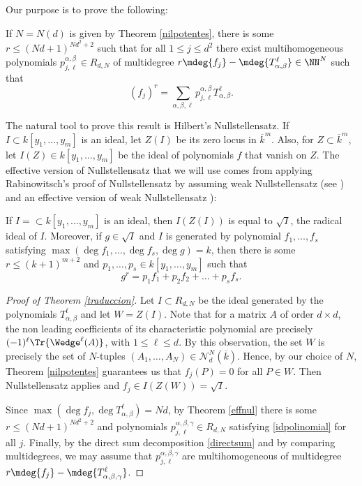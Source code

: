 Our purpose is to prove the following:
\begin{teo}\label{traduccion}
If $N\!=\!N(d)$ is given by Theorem \ref{nilpotentes}, there is some \hbox{$r\!\leq\!(Nd\!+\!1)^{Nd^2+2}$} such that for all $1\leq j\leq d^2$ there exist multihomogeneous polynomials $p^{\alpha,\beta}_{j,\ell} \in R_{d,N}$ of multidegree $r\mdeg{f_{j}}-\mdeg{T^{\ell}_{\alpha,\beta}}\in {\NN}^{N}$ such that
\begin{equation}\label{idpolinomial}
(f_{j})^{r}=\sum_{\alpha,\beta,\ell}{p^{\alpha,\beta}_{j,\ell}T^{\ell}_{\alpha,\beta}}.
\end{equation}
\end{teo}

The natural tool to prove this result is Hilbert's Nullstellensatz. If $I\subset k[y_1,\dots,y_m]$ is an ideal, let $Z(I)$ be its zero locus in ${\overline{k}}^m$. Also, for $Z\subset \overline{k}^m$, let $I(Z)\in k[y_1,\dots,y_m]$ be the ideal of polynomials $f$ that vanish on $Z$. The effective version of Nullstellensatz that we will use comes from applying Rabinowitsch's proof of Nullstellensatz by assuming weak Nullstellensatz (see \eg \cite[\S 1.7]{fulton}) and an effective version of weak Nullstellensatz \cite{som}):

\begin{teo}\label{effnul} If $I=\subset k[y_1,\dots,y_m]$ is an ideal, then $I(Z(I))$ is equal to $\sqrt{I}$, the radical ideal of $I$. Moreover, if $g\in \sqrt{I}$ and $I$ is generated by polynomial $f_1,\dots,f_s$ satisfying $\max(\deg{f_1},\dots,\deg{f_s},\deg{g})=k$, then there is some $r\leq (k+1)^{m+2}$ and $p_1,\dots,p_s\in k[y_1,\dots,y_m]$ such that
\begin{equation*}
g^r=p_1f_1+p_2f_2+\dots+p_sf_s.
\end{equation*}
\end{teo}
\begin{proof}[Proof of Theorem \ref{traduccion}]
Let $I\subset R_{d,N}$ be the ideal generated by the polynomials $T_{\alpha,\beta}^{\ell}$ and let $W=Z(I)$.
Note that for a matrix $A$ of order $d\times d$, the non leading coefficients of its characteristic polynomial are precisely $(-1)^{\ell}\Tr{\Wedge^{\ell}(A)}$, with $1\leq \ell \leq d$. By this observation, the set $W$ is precisely the set of $N$-tuples $(A_1,\dots,A_N)\in \mathcal{N}_{d}^{N}(\overline{k})$. Hence, by our choice of $N$, Theorem \ref{nilpotentes} guarantees us that $f_{j}(P)=0$ for all $P\in W$. Then Nullstellensatz applies and $f_{j}\in I(Z(W))=\sqrt{I}$.

Since $\max(\deg{f_j},\deg{T_{\alpha,\beta}^{\ell}})=Nd$, by Theorem \ref{effnul} there is some $r\leq (Nd+1)^{Nd^2+2}$ and polynomials $p_{j,\ell}^{\alpha,\beta,\gamma}\in R_{d,N}$ satisfying \eqref{idpolinomial} for all $j$. Finally, by the direct sum decomposition \eqref{directsum} and by comparing multidegrees, we may assume that $p^{\alpha,\beta,\gamma}_{j,\ell}$ are multihomogeneous of multidegree $r\mdeg{f_{j}}-\mdeg{T^{\ell}_{\alpha,\beta,\gamma}}$.
\end{proof}

